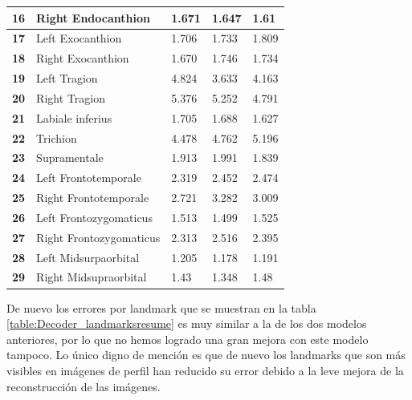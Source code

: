 \begin{table}[!ht]
\begin{tabular}{|l|l|l|l|l|}
                \textbf{16} & Right Endocanthion & 1.671 & 1.647 & \cellcolor{green!25} 1.61 \\ \hline
                \textbf{17} & Left Exocanthion & \cellcolor{green!25} 1.706 & 1.733 & 1.809 \\ \hline
                \textbf{18} & Right Exocanthion & \cellcolor{green!25} 1.670 & 1.746 & 1.734 \\ \hline
                \textbf{19} & Left Tragion & 4.824 & \cellcolor{green!25} 3.633 & 4.163 \\ \hline
                \textbf{20} & Right Tragion & 5.376 & 5.252 & \cellcolor{green!25} 4.791 \\ \hline
                \textbf{21} & Labiale inferius & 1.705 & 1.688 & \cellcolor{green!25} 1.627 \\ \hline
                \textbf{22} & Trichion & \cellcolor{green!25} 4.478 & 4.762 & 5.196 \\ \hline
                \textbf{23} & Supramentale & 1.913 & 1.991 & \cellcolor{green!25} 1.839 \\ \hline
                \textbf{24} & Left Frontotemporale & \cellcolor{green!25} 2.319 & 2.452 & 2.474 \\ \hline
                \textbf{25} & Right Frontotemporale & \cellcolor{green!25} 2.721 & 3.282 & 3.009 \\ \hline
                \textbf{26} & Left Frontozygomaticus & 1.513 & \cellcolor{green!25} 1.499 & 1.525 \\ \hline
                \textbf{27} & Right Frontozygomaticus & \cellcolor{green!25} 2.313 & 2.516 & 2.395 \\ \hline
                \textbf{28} & Left Midsurpaorbital & 1.205 & \cellcolor{green!25} 1.178 & 1.191 \\ \hline
                \textbf{29} & Right Midsupraorbital & 1.43 & \cellcolor{green!25} 1.348 & 1.48 \\ \hline
            \end{tabular}
            \label{table:Decoder_landmarksresume}
        \end{table}
        \medskip 

        \noindent De nuevo los errores por landmark que se muestran en la tabla \autoref{table:Decoder_landmarksresume} es muy similar a la de los dos modelos anteriores, por lo que no hemos logrado una gran mejora con este modelo tampoco. Lo único digno de mención es que de nuevo los landmarks que son más visibles en imágenes de perfil han reducido su error debido a la leve mejora de la reconstrucción de las imágenes. 

